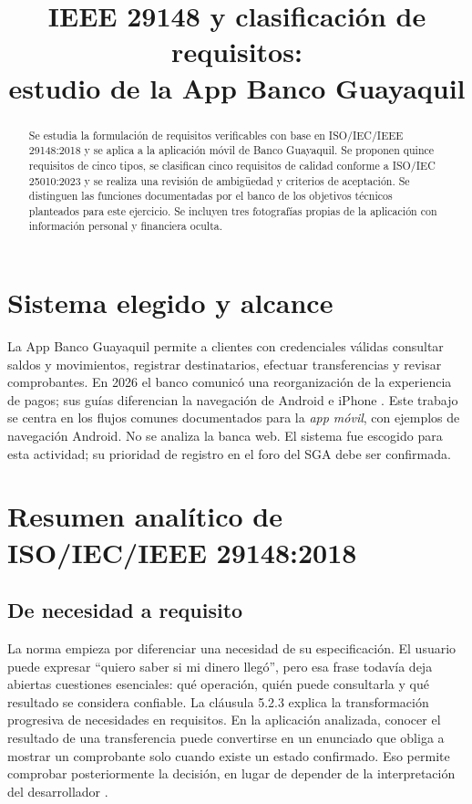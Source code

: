 \documentclass[conference,a4paper]{IEEEtran}
\title{IEEE 29148 y clasificación de requisitos:\\ estudio de la App Banco Guayaquil}
\author{\IEEEauthorblockN{Cedeño Avila Winston Damian}
\IEEEauthorblockA{Universidad Técnica Estatal de Quevedo (UTEQ)\\Ingeniería de Software -- 4.º ``B'' -- ISR-401\\TA-TAR-01 / TA-IND-01 -- 7 de noviembre de 2026}}
\begin{document}
\maketitle
\begin{abstract}
Se estudia la formulación de requisitos verificables con base en ISO/IEC/IEEE 29148:2018 y se aplica a la aplicación móvil de Banco Guayaquil. Se proponen quince requisitos de cinco tipos, se clasifican cinco requisitos de calidad conforme a ISO/IEC 25010:2023 y se realiza una revisión de ambigüedad y criterios de aceptación. Se distinguen las funciones documentadas por el banco de los objetivos técnicos planteados para este ejercicio. Se incluyen tres fotografías propias de la aplicación con información personal y financiera oculta.
\end{abstract}
\section{Sistema elegido y alcance}
La App Banco Guayaquil permite a clientes con credenciales válidas consultar saldos y movimientos, registrar destinatarios, efectuar transferencias y revisar comprobantes. En 2026 el banco comunicó una reorganización de la experiencia de pagos; sus guías diferencian la navegación de Android e iPhone \cite{banco2026,ayudaBG,saldosBG,comproBG}. Este trabajo se centra en los flujos comunes documentados para la \emph{app móvil}, con ejemplos de navegación Android. No se analiza la banca web. El sistema fue escogido para esta actividad; su prioridad de registro en el foro del SGA debe ser confirmada.
\section{Resumen analítico de ISO/IEC/IEEE 29148:2018}
\subsection{De necesidad a requisito}\label{sec:resumen}
La norma empieza por diferenciar una necesidad de su especificación. El usuario puede expresar ``quiero saber si mi dinero llegó'', pero esa frase todavía deja abiertas cuestiones esenciales: qué operación, quién puede consultarla y qué resultado se considera confiable. La cláusula 5.2.3 explica la transformación progresiva de necesidades en requisitos. En la aplicación analizada, conocer el resultado de una transferencia puede convertirse en un enunciado que obliga a mostrar un comprobante solo cuando existe un estado confirmado. Eso permite comprobar posteriormente la decisión, en lugar de depender de la interpretación del desarrollador \cite[cl.~5.2.3]{iso29148}.
\end{document}
